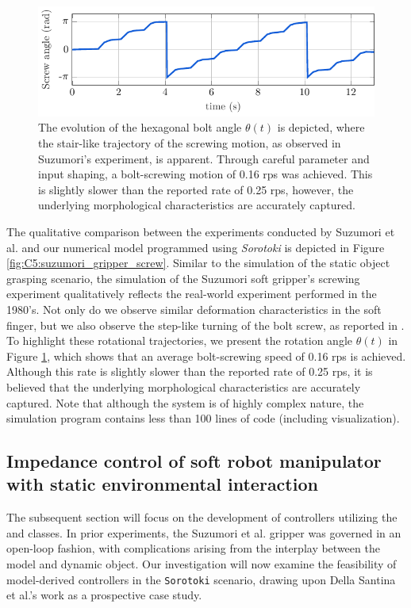 %
\begin{figure}[!b]
    \centering
    \vspace{-3mm}
    \includegraphics*[width=.95\textwidth]{./pdf/thesis-figure-6-28.pdf}
    \caption{The evolution of the hexagonal bolt angle $\theta(t)$ is depicted, where the stair-like trajectory of the screwing motion, as observed in Suzumori's experiment, is apparent. Through careful parameter and input shaping, a bolt-screwing motion of 0.16 rps was achieved. This is slightly slower than the reported rate of 0.25 rps, however, the underlying morphological characteristics are accurately captured.}
    \label{fig:C5:suzumori_gripper_screw_states}
\end{figure}

The qualitative comparison between the experiments conducted by Suzumori et al. \cite{Suzumori1991,Suzumori1992} and our numerical model programmed using \textit{Sorotoki} is depicted in Figure \ref{fig:C5:suzumori_gripper_screw}. Similar to the simulation of the static object grasping scenario, the simulation of the Suzumori soft gripper's screwing experiment qualitatively reflects the real-world experiment performed in the 1980's. Not only do we observe similar deformation characteristics in the soft finger, but we also observe the step-like turning of the bolt screw, as reported in \cite{Suzumori1992}. To highlight these rotational trajectories, we present the rotation angle $\theta(t)$ in Figure \ref{fig:C5:suzumori_gripper_screw_states}, which shows that an average bolt-screwing speed of 0.16 rps is achieved. Although this rate is slightly slower than the reported rate of 0.25 rps, it is believed that the underlying morphological characteristics are accurately captured. Note that although the system is of highly complex nature, the simulation program contains less than 100 lines of code (including visualization).

\subsection[Environmental impedance control of soft manipulator]{Impedance control of soft robot manipulator with static environmental interaction}
The subsequent section will focus on the development of controllers utilizing the  and  classes. In prior experiments, the Suzumori et al. gripper was governed in an open-loop fashion, with complications arising from the interplay between the model and dynamic object. Our investigation will now examine the feasibility of model-derived controllers in the \texttt{Sorotoki} scenario, drawing upon Della Santina et al.'s work \cite{DellaSantina2020a} as a prospective case study.

